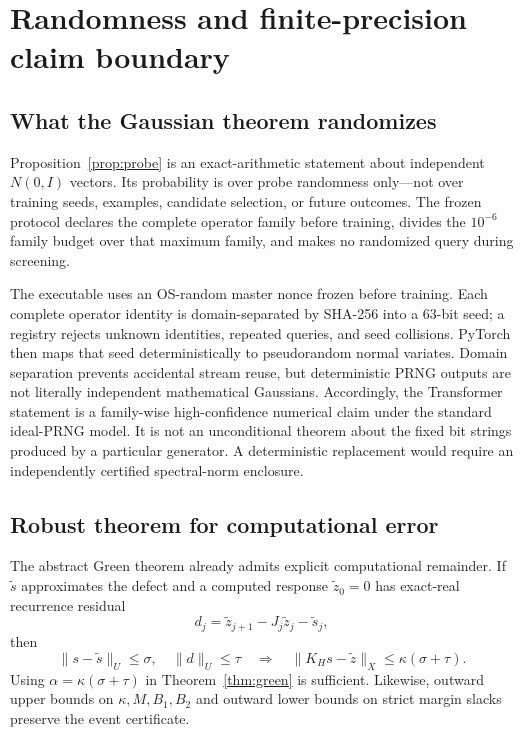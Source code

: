 \section{Randomness and finite-precision claim boundary}
\label{app:randomness-numerics}

\subsection{What the Gaussian theorem randomizes}

Proposition~\ref{prop:probe} is an exact-arithmetic statement about independent
$N(0,I)$ vectors.  Its probability is over probe randomness only---not over
training seeds, examples, candidate selection, or future outcomes.  The frozen
protocol declares the complete operator family before training, divides the
$10^{-6}$ family budget over that maximum family, and makes no randomized query
during screening.

The executable uses an OS-random master nonce frozen before training.  Each
complete operator identity is domain-separated by SHA-256 into a 63-bit seed;
a registry rejects unknown identities, repeated queries, and seed collisions.
PyTorch then maps that seed deterministically to pseudorandom normal variates.
Domain separation prevents accidental stream reuse, but deterministic PRNG
outputs are not literally independent mathematical Gaussians.  Accordingly,
the Transformer statement is a family-wise high-confidence numerical claim
under the standard ideal-PRNG model.  It is not an unconditional theorem about
the fixed bit strings produced by a particular generator.  A deterministic
replacement would require an independently certified spectral-norm enclosure.

\subsection{Robust theorem for computational error}

The abstract Green theorem already admits explicit computational remainder.
If $\widetilde s$ approximates the defect and a computed response
$\widetilde z_0=0$ has exact-real recurrence residual
\begin{equation}
 d_j=\widetilde z_{j+1}-J_j\widetilde z_j-\widetilde s_j,
\end{equation}
then
\begin{equation}
 \lVert s-\widetilde s\rVert_U\le\sigma,\quad
 \lVert d\rVert_U\le\tau
 \quad\Longrightarrow\quad
 \lVert K_Hs-\widetilde z\rVert_X\le\kappa(\sigma+\tau).
\end{equation}
Using $\alpha=\kappa(\sigma+\tau)$ in Theorem~\ref{thm:green} is sufficient.  Likewise,
outward upper bounds on $\kappa,M,B_1,B_2$ and outward lower bounds on strict
margin slacks preserve the event certificate.

